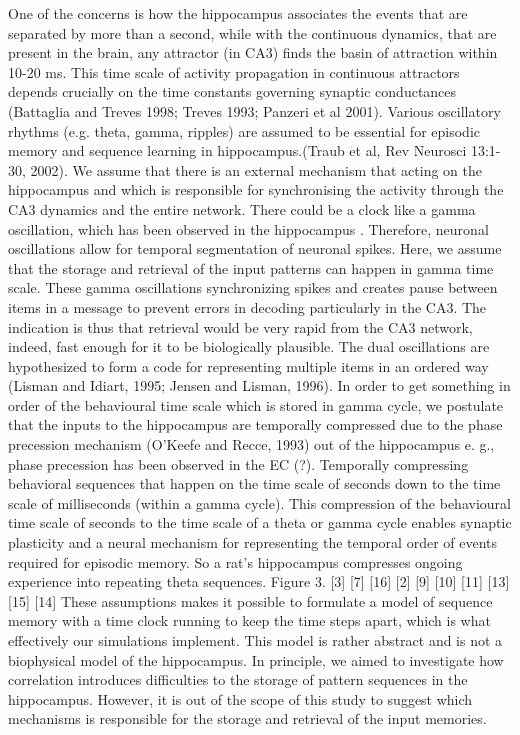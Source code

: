 \documentclass[utf8]{frontiersSCNS} %
\begin{document}
One of the concerns is how the hippocampus associates the events that are separated by more than a second, while with the continuous dynamics, that are present in the brain, any attractor (in CA3) finds the basin of attraction within 10-20 ms. This time scale of activity propagation in continuous attractors depends crucially on the time constants governing synaptic conductances (Battaglia and Treves 1998; Treves 1993; Panzeri et al 2001). 
%
Various oscillatory rhythms (e.g. theta, gamma, ripples) are assumed to be essential for episodic memory and sequence learning in hippocampus.(Traub et al, Rev Neurosci 13:1-30, 2002).
%
We assume that there is an external mechanism that acting on the hippocampus and which is responsible for synchronising the activity through the CA3 dynamics and the entire network. There could be a clock like a gamma oscillation, which has been observed in the hippocampus \cite{jensen2007human}. Therefore, neuronal oscillations allow for temporal segmentation of neuronal spikes. 
%
Here, we assume that the storage and retrieval of the input patterns can happen in gamma time scale.
%
These gamma oscillations synchronizing spikes and creates pause between items in a message to prevent errors in decoding particularly in the CA3. 
%
The indication is thus that retrieval would be very rapid from the CA3 network, indeed, fast enough for it to be biologically plausible.
%
The dual oscillations are hypothesized to form a code for representing multiple items in an ordered way (Lisman and Idiart, 1995; Jensen and Lisman, 1996). 
%
In order to get something in order of the behavioural time scale which is stored in gamma cycle, we postulate that the inputs to the hippocampus are temporally compressed due to the phase precession mechanism (O'Keefe and Recce, 1993) out of the hippocampus e. g., phase precession has been observed in the EC (?). 
%
Temporally compressing behavioral sequences that happen on the time scale of seconds down to the time scale of milliseconds (within a gamma cycle). This compression of the behavioural time scale of seconds to the time scale of a theta or gamma cycle enables synaptic plasticity and a neural mechanism for representing the temporal order of events required for episodic memory. So a rat's hippocampus compresses ongoing experience into repeating theta sequences. Figure 3. [3] [7] [16] [2] [9] [10] [11] [13][15] [14]
%
These assumptions makes it possible to formulate a model of sequence memory with a time clock running to keep the time steps apart, which is what effectively our simulations implement. 
%
This model is rather abstract and is not a biophysical model of the hippocampus. In principle, we aimed to investigate how correlation introduces difficulties to the storage of pattern sequences in the hippocampus.
However, it is out of the scope of this study to suggest which mechanisms is responsible for the storage and retrieval of the input memories.   
%
\end{document}
